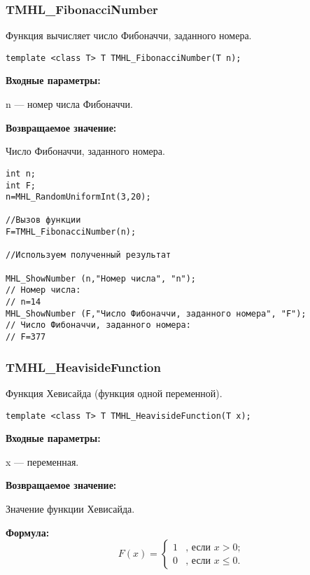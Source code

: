 \documentclass[a4paper,12pt]{article}
\begin{document}
\subsubsection{TMHL\_FibonacciNumber}\label{TMHL_FibonacciNumber}

Функция вычисляет число Фибоначчи, заданного номера.


\begin{lstlisting}[label=code_syntax_TMHL_FibonacciNumber,caption=Синтаксис]
template <class T> T TMHL_FibonacciNumber(T n);
\end{lstlisting}

\textbf{Входные параметры:}  
 
 n --- номер числа Фибоначчи.

\textbf{Возвращаемое значение:}
 
 Число Фибоначчи, заданного номера.


\begin{lstlisting}[label=code_use_TMHL_FibonacciNumber,caption=Пример использования]
int n;
int F;
n=MHL_RandomUniformInt(3,20);

//Вызов функции
F=TMHL_FibonacciNumber(n);

//Используем полученный результат

MHL_ShowNumber (n,"Номер числа", "n");
// Номер числа:
// n=14
MHL_ShowNumber (F,"Число Фибоначчи, заданного номера", "F");
// Число Фибоначчи, заданного номера:
// F=377
\end{lstlisting}

\subsubsection{TMHL\_HeavisideFunction}\label{TMHL_HeavisideFunction}

Функция Хевисайда (функция одной переменной).


\begin{lstlisting}[label=code_syntax_TMHL_HeavisideFunction,caption=Синтаксис]
template <class T> T TMHL_HeavisideFunction(T x);
\end{lstlisting}

\textbf{Входные параметры:}

 x --- переменная.

\textbf{Возвращаемое значение:}
 
 Значение функции Хевисайда.
 
\textbf{Формула:}
\begin{equation*}
F\left(x \right)=\left\lbrace \begin{aligned}
1&\text{, если } x>0; \\
0&\text{, если } x\leq 0.
\end{aligned}\right. 
\end{equation*}
\end{document}
